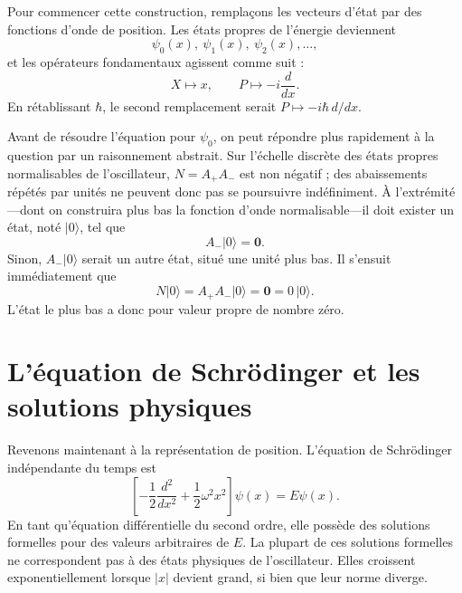 Pour commencer cette construction, remplaçons les vecteurs d’état par des fonctions d’onde de position. Les états propres de l’énergie deviennent
\[
\psi_{0}(x),\ \psi_{1}(x),\ \psi_{2}(x),\ldots,
\]
et les opérateurs fondamentaux agissent comme suit :
\begin{equation}
X\longmapsto x,\qquad
P\longmapsto -i\frac{d}{dx}.
\end{equation}
En rétablissant \(\hbar\), le second remplacement serait
\(P\mapsto-i\hbar\,d/dx\).

Avant de résoudre l’équation pour \(\psi_{0}\), on peut répondre plus rapidement à la question par un raisonnement abstrait. Sur l’échelle discrète des états propres normalisables de l’oscillateur, \(N=A_{+}A_{-}\) est non négatif ; des abaissements répétés par unités ne peuvent donc pas se poursuivre indéfiniment. À l’extrémité---dont on construira plus bas la fonction d’onde normalisable---il doit exister un état, noté \(\lvert0\rangle\), tel que
\begin{equation}
A_{-}\lvert0\rangle=\mathbf 0.
\end{equation}
Sinon, \(A_{-}\lvert0\rangle\) serait un autre état, situé une unité plus bas. Il s’ensuit immédiatement que
\begin{equation}
N\lvert0\rangle
=A_{+}A_{-}\lvert0\rangle
=\mathbf 0
=0\,\lvert0\rangle.
\end{equation}
L’état le plus bas a donc pour valeur propre de nombre zéro.

\begin{classroomqa}
\end{classroomqa}

\section{L’équation de Schr\"odinger et les solutions physiques}

Revenons maintenant à la représentation de position. L’équation de Schr\"odinger indépendante du temps est
\begin{equation}
\left[
-\frac12\frac{d^{2}}{dx^{2}}
+\frac12\omega^{2}x^{2}
\right]\psi(x)=E\psi(x).
\end{equation}
En tant qu’équation différentielle du second ordre, elle possède des solutions formelles pour des valeurs arbitraires de \(E\). La plupart de ces solutions formelles ne correspondent pas à des états physiques de l’oscillateur. Elles croissent exponentiellement lorsque \(\lvert x\rvert\) devient grand, si bien que leur norme diverge.

